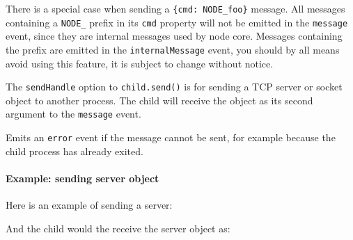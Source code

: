 There is a special case when sending a
\texttt{\{cmd:\ \textquotesingle{}NODE\_foo\textquotesingle{}\}}
message. All messages containing a \texttt{NODE\_} prefix in its
\texttt{cmd} property will not be emitted in the \texttt{message} event,
since they are internal messages used by node core. Messages containing
the prefix are emitted in the \texttt{internalMessage} event, you should
by all means avoid using this feature, it is subject to change without
notice.

The \texttt{sendHandle} option to \texttt{child.send()} is for sending a
TCP server or socket object to another process. The child will receive
the object as its second argument to the \texttt{message} event.

Emits an \texttt{\textquotesingle{}error\textquotesingle{}} event if the
message cannot be sent, for example because the child process has
already exited.

\paragraph{Example: sending server
object}\label{example-sending-server-object}

Here is an example of sending a server:

\begin{Shaded}
\begin{Highlighting}[]
 \NormalTok{(}\NormalTok{(}\NormalTok{);}

 \NormalTok{(}\NormalTok{();}
\NormalTok{(}\NormalTok{, } 
  \NormalTok{(}\NormalTok{);}
\NormalTok{\});}
\NormalTok{(}\NormalTok{, }\NormalTok{() \{}
  \NormalTok{(}
\NormalTok{\});}
\end{Highlighting}
\end{Shaded}

And the child would the receive the server object as:

